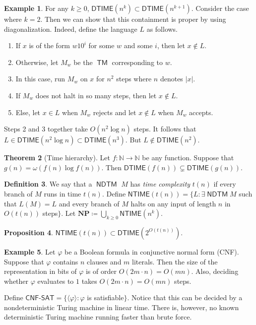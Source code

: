 \documentclass[10pt,letterpaper,cm]{nupset}
\theoremstyle{definition}
\newtheorem{definition}{Definition}[subsection]
\newtheorem{exmp}[definition]{Example}
\theoremstyle{theorem}
\newtheorem{theorem}[definition]{Theorem}
\newtheorem{prop}[definition]{Proposition}
\theoremstyle{remark}
\newcommand{\N}{\mathbb N}
\newcommand{\1}{\mathbf{1}}
\newcommand{\0}{\vec 0}
\DeclareMathOperator{\TM}{\mathsf{TM}}
\DeclareMathOperator{\NDTM}{\mathsf{NDTM}}
\begin{document}
\begin{exmp}
For any $k\geq 0$, $\mathsf{DTIME}(n^k) \subset \mathsf{DTIME}(n^{k+1})$. Consider the case where $k=2$. Then we can show that this containment  is proper by using diagonalization. Indeed, define the language $L$ as follows. 
\begin{enumerate}
\item If $x$ is of the form $w10^i$ for some $w$ and some $i$, then let $x\notin L$.
\item Otherwise, let $M_w$ be the $\TM$ corresponding to $w$. 
\item In this case, run $M_w$ on $x$ for $n^2$ steps where $n$ denotes $|x|$. 
\item  If $M_w$ does not halt in so many steps, then let $x\notin L$. 
\item Else, let $x\in L$ when $M_w$ rejects and let $x\notin L$ when $M_w$ accepts. 
\end{enumerate}
Steps 2 and 3 together take $O(n^2 \log{n})$ steps. It follows that $L \in \mathsf{DTIME}(n^2\log{n})\subset \mathsf{DTIME}(n^3)$. But $L \notin \mathsf{DTIME}(n^2)$.
\end{exmp}

\begin{theorem}[Time hierarchy]
Let $f: \N \to \N$ be any function. Suppose that $g(n) = \omega(f(n) \log{f(n)})$. Then $\mathsf{DTIME}(f(n)) \subsetneq \mathsf{DTIME}(g(n))$.
\end{theorem}

\begin{definition}
We say that a $\NDTM$ $M$ has \textit{time complexity} $t(n)$ if every branch of $M$ runs in time $t(n)$. Define  $\mathsf{NTIME}(t(n)) = \{ L : \exists \NDTM M$ such that $L(M) = L$ and every branch of $M$ halts on any input of length $n$ in $O(t(n))$ steps$\}$. Let $\mathbf{NP} \coloneqq \bigcup_{k \geq 0} \mathsf{NTIME}(n^k)$.
\end{definition}

\begin{prop}
$\mathsf{NTIME}(t(n)) \subset \mathsf{DTIME}(2^{O(t(n))})$.
\end{prop}

\begin{exmp}
Let $\varphi$ be a Boolean formula in conjunctive normal form (CNF). Suppose that $\varphi$ contains $n$ clauses and $m$ literals. Then the size of the representation in bits of $\varphi$ is of order $O(2 m \cdot n) = O(mn)$. Also, deciding whether $\varphi$ evaluates to $1$ takes  $O(2 m \cdot n) = O(mn)$ steps. 

Define $\mathsf{CNF\text{-}SAT} = \{\langle \varphi \rangle : \varphi$ is satisfiable$\}$. Notice that this can be decided by a nondeterministic Turing machine in linear time.  There is, however, no known deterministic Turing machine running faster than brute force. 
\end{exmp}
\end{document}
